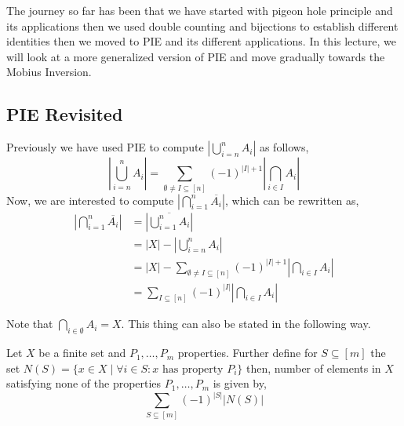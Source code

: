 


The journey so far has been that we have started with pigeon hole principle and its applications then we used double counting and bijections to establish different identities then we moved to PIE and its different applications.
In this lecture, we will look at a more generalized version of PIE and move gradually towards the Mobius Inversion.

\subsection{PIE Revisited}
Previously we have used PIE to compute $\left| \bigcup^n _{i=n} A_i \right|$ as follows,
\[ \left| \bigcup^n _{i=n} A_i \right|=\sum_{\emptyset \neq I \subseteq [n]} (-1)^{|I|+1}\left|\bigcap_{i\in I} A_i\right|\]
Now, we are interested to compute $\left|\bigcap_{i=1}^n  \overline{A_i}\right|$, which can be rewritten as,
\begin{align}
  \left|\bigcap_{i=1}^n  \overline{A_i}\right| & = \left|
  \overline{\bigcup_{i=1}^n  A_i}
  \right| \nonumber \tag{using De-morgan's law}                                                                                                                    \\
                                               & = \left| X \right| - \left| \bigcup^n _{i=n} A_i \right| \nonumber                                                \\
                                               & = \left| X \right| -\sum_{\emptyset \neq I \subseteq [n]} (-1)^{|I|+1}\left|\bigcap_{i\in I} A_i\right| \nonumber \\
                                               & = \sum_{ I \subseteq [n]} (-1)^{|I|}\left|\bigcap_{i\in I} A_i\right|
\end{align}

Note that $\bigcap_{i\in \emptyset} A_i =X$. This thing can also be stated in the following way.

\begin{theorem}
  Let $X$ be a finite set and $P_1,\dots, P_m$ properties. Further define for $S \subseteq [m]$ the set $N(S) = \{x\in X \mid \forall i \in S: x \text{ has property } P_i\}$  then, number of elements in $X$ satisfying none of the properties $P_1,\dots, P_m$ is given by,
  $$ \sum_{S \subseteq [m]} (-1)^{|S|} \left| N(S) \right|$$
\end{theorem}

